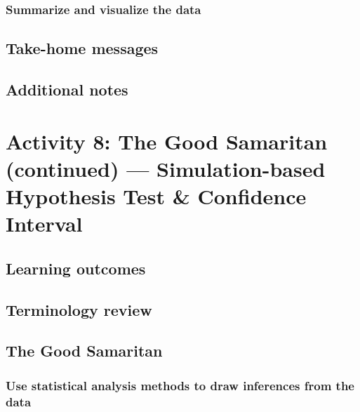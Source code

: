 \documentclass[
]{report}
\begin{document}
\hypertarget{summarize-and-visualize-the-data-1}{%
\subsubsection*{Summarize and visualize the data}\label{summarize-and-visualize-the-data-1}}

\hypertarget{take-home-messages-13}{%
\subsection{Take-home messages}\label{take-home-messages-13}}

\hypertarget{additional-notes-12}{%
\subsection{Additional notes}\label{additional-notes-12}}

\hypertarget{activity-8-the-good-samaritan-continued-simulation-based-hypothesis-test-confidence-interval}{%
\section{Activity 8: The Good Samaritan (continued) --- Simulation-based Hypothesis Test \& Confidence Interval}\label{activity-8-the-good-samaritan-continued-simulation-based-hypothesis-test-confidence-interval}}

\hypertarget{learning-outcomes-15}{%
\subsection{Learning outcomes}\label{learning-outcomes-15}}

\hypertarget{terminology-review-14}{%
\subsection{Terminology review}\label{terminology-review-14}}

\hypertarget{the-good-samaritan-1}{%
\subsection{The Good Samaritan}\label{the-good-samaritan-1}}

\hypertarget{use-statistical-analysis-methods-to-draw-inferences-from-the-data-2}{%
\subsubsection*{Use statistical analysis methods to draw inferences from the data}\label{use-statistical-analysis-methods-to-draw-inferences-from-the-data-2}}
\end{document}
